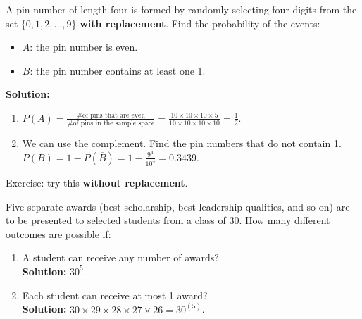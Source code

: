 \begin{example}
    A pin number of length four is formed by randomly selecting four digits from the set $\{0, 1, 2, \ldots, 9\}$ \textbf{with replacement}.
    Find the probability of the events:
    \begin{itemize}
        \item $A$: the pin number is even.
        \item $B$: the pin number contains at least one 1.
    \end{itemize}
    \textbf{Solution: }
    \begin{enumerate}[label={(\alph*)}]
        \item $P(A) = \frac{\text{\# of pins that are even}}{\text{\# of pins in the sample space}} = \frac{10 \times 10 \times 10 \times 5}{10 \times 10 \times 10 \times 10} = \frac{1}{2}$.
        \item We can use the complement. Find the pin numbers that do not contain 1. \\ 
        $P(B) = 1 - P(\overline{B}) = 1 - \frac{9^4}{10^4} = 0.3439$.
    \end{enumerate}
    Exercise: try this \textbf{without replacement}.
\end{example}

\newpage

\begin{example}
    Five separate awards (best scholarship, best leadership qualities, and so on) are to be 
    presented to selected students from a class of 30. How many different outcomes are possible if:

    \begin{enumerate}[label={(\alph*)}]
        \item A student can receive any number of awards?   \\
        \textbf{Solution: } $30^5$.
        \item Each student can receive at most 1 award?     \\
        \textbf{Solution: } $30 \times 29 \times 28 \times 27 \times 26 = 30^{(5)}$.
    \end{enumerate}
\end{example}

